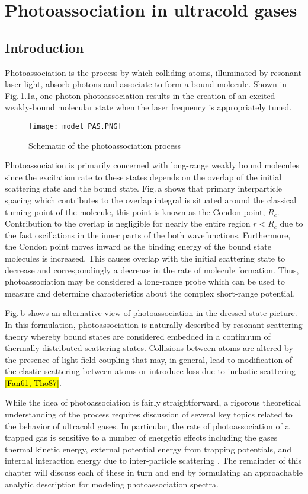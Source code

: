 \chapter{Photoassociation in ultracold gases} \label{ch:chap3}
\section{Introduction} \label{sec:pas_intro}
Photoassociation is the process by which colliding atoms, illuminated by resonant laser light, absorb photons and associate to form a bound molecule.
Shown in Fig.\,\ref{fig:3pasSch}a, one-photon photoassociation results in the creation of an excited weakly-bound molecular state when the laser frequency is appropriately tuned.
\begin{figure}
\label{fig:3pasSch}
	\centerline{
	\texttt{[image: model\_PAS.PNG]}}
	\caption{Schematic of the photoassociation process}{}
\end{figure} 
Photoassociation is primarily concerned with long-range weakly bound molecules since the excitation rate to these states depends on the overlap of the initial scattering state and the bound state.
Fig.\,a shows that primary interparticle spacing which contributes to the overlap integral is situated around the classical turning point of the molecule, this point is known as the Condon point, $R_c$.
Contribution to the overlap is negligible for nearly the entire region $r < R_c$ due to the fast oscillations in the inner parts of the both wavefunctions.
Furthermore, the Condon point moves inward as the binding energy of the bound state molecules is increased. 
This causes overlap with the initial scattering state to decrease and correspondingly a decrease in the rate of molecule formation.
Thus, photoassociation may be considered a long-range probe which can be used to measure and determine characteristics about the complex short-range potential.

Fig.\,b shows an alternative view of photoassociation in the dressed-state picture.
In this formulation, photoassociation is naturally described by resonant scattering theory whereby bound states are considered embedded in a continuum of thermally distributed scattering states.
Collisions between atoms are altered by the presence of light-field coupling that may, in general, lead to modification of the elastic scattering between atoms or introduce loss due to inelastic scattering  \cite{Jones2006} \hl{[Fan61, Tho87]}.

While the idea of photoassociation is fairly straightforward, a rigorous theoretical understanding of the process requires discussion of several key topics related to the behavior of ultracold gases.
In particular, the rate of photoassociation of a trapped gas is sensitive to a number of energetic effects including the gases thermal kinetic energy, external potential energy from trapping potentials, and internal interaction energy due to inter-particle scattering \cite{Krems2009b}.
The remainder of this chapter will discuss each of these in turn and end by formulating an approachable analytic description for modeling photoassociation spectra.	

